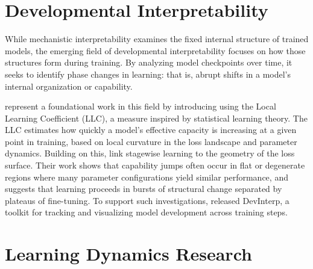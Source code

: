 

\section{Developmental Interpretability}

While mechanistic interpretability examines the fixed internal structure of trained models, the emerging field of developmental interpretability focuses on how those structures form during training. By analyzing model checkpoints over time, it seeks to identify phase changes in learning: that is, abrupt shifts in a model's internal organization or capability.

\citet{hoogland2023towards} represent a foundational work in this field by introducing using the Local Learning Coefficient (LLC), a measure inspired by statistical learning theory. The LLC estimates how quickly a model's effective capacity is increasing at a given point in training, based on local curvature in the loss landscape and parameter dynamics. Building on this, \citet{hoogland2025losslandscape} link stagewise learning to the geometry of the loss surface. Their work shows that capability jumps often occur in flat or degenerate regions where many parameter configurations yield similar performance, and suggests that learning proceeds in bursts of structural change separated by plateaus of fine-tuning. To support such investigations, \citet{devinterpcode} released DevInterp, a toolkit for tracking and visualizing model development across training steps.

\section{Learning Dynamics Research}

